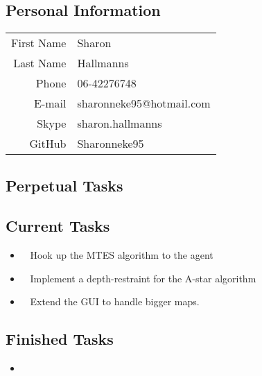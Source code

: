 \subsection{Personal Information}
\begin{table}[h!]
	\begin{tabular}{rl}
	    First Name 	& Sharon\\
	    Last Name	& Hallmanns\\
	    Phone		& 06-42276748\\
	    E-mail		& sharonneke95@hotmail.com\\
	    Skype		& sharon.hallmanns\\
	    GitHub		& Sharonneke95\\
    \end{tabular}
\end{table}

\subsection{Perpetual Tasks}

\subsection{Current Tasks}
\begin{itemize}
	\item~
	Hook up the MTES algorithm to the agent
	\item~
	Implement a depth-restraint for the A-star algorithm
	\item~
	Extend the GUI to handle bigger maps.
\end{itemize}

\subsection{Finished Tasks}
\begin{itemize}
	\item
\end{itemize}